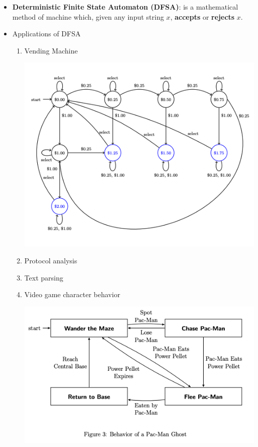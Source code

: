 \documentclass[12pt]{article}
\begin{document}
\bigskip

\begin{itemize}
    \item \textbf{Deterministic Finite State Automaton (DFSA)}: is a mathematical
    method of machine which, given any input string $x$, \textbf{accepts} or
    \textbf{rejects} $x$.

    \item Applications of DFSA
    \begin{enumerate}[1.]
        \item Vending Machine
        \begin{center}
        \includegraphics[width=0.8 \linewidth]{images/worksheet_8_notes_1.png}
        \end{center}

        \item Protocol analysis
        \item Text parsing
        \item Video game character behavior

        \begin{center}
        \includegraphics[width=0.8 \linewidth]{images/worksheet_8_notes_2.png}
        \end{center}


\end{enumerate}
\end{itemize}
\end{document}
